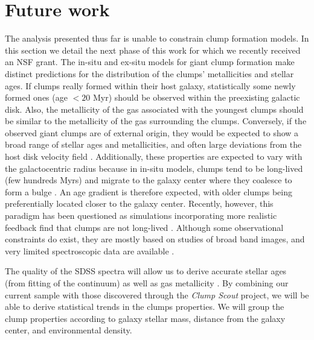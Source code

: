 

\section{Future work}
\label{chap5: future}

The analysis presented thus far is unable to constrain clump formation models. In this section we detail the next phase of this work for which we recently received an NSF grant. 
The in-situ and ex-situ models for giant clump formation make distinct predictions for the distribution of the clumps’ metallicities and stellar ages. If clumps really formed within their host galaxy, statistically some newly formed ones (age $< 20$ Myr) should be observed within the preexisting galactic disk. Also, the metallicity of the gas associated with the youngest clumps should be similar to the metallicity of the gas surrounding the clumps. Conversely, if the observed giant clumps are of external origin, they would be expected to show a broad range of stellar ages and metallicities, and often large deviations from the host disk velocity field \citep{Bournaud2008,WuFoSch2012}. Additionally, these properties are expected to vary with the galactocentric radius because in in-situ models, clumps tend to be long-lived (few hundreds Myrs) and migrate to the galaxy center where they coalesce to form a bulge \citep{Bournaud2016}. An age gradient is therefore expected, with older clumps being preferentially located closer to the galaxy center. Recently, however, this paradigm has been questioned as simulations incorporating more realistic feedback find that clumps are not long-lived \citep{Genel2012,Hopkins2012,Oklopcic2017}. Although some observational constraints do exist, they are mostly based on studies of broad band images, and very limited spectroscopic data are available \citep{Guo2012,Zanella2015}. 

The quality of the SDSS spectra will allow us to derive accurate stellar ages (from fitting of the continuum) as well as gas metallicity \citep{Henry2015}. By combining our current sample with those discovered through the \textit{Clump Scout} project, we will be able to derive statistical trends in the clumps properties. We will group the clump properties according to galaxy stellar mass, distance from the galaxy center, and environmental density. 


